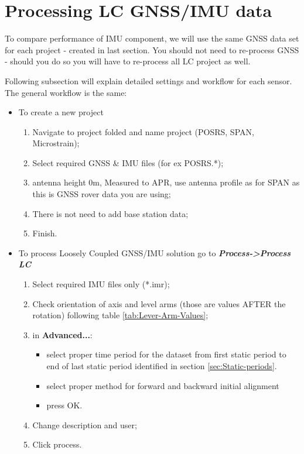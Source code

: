 \documentclass[british]{book}
\begin{document}
\chapter{Processing LC GNSS/IMU data\label{sec:Processing-Loosely-Coupled}}

To compare performance of IMU component, we will use the same GNSS data set for each project - created in last section. You should not need to re-process GNSS - should you do so you will have to re-process all LC project as well.  

Following subsection will explain detailed settings and workflow for each sensor. The general workflow is the same:

\begin{itemize}
	\item To create a new project 
	\begin{enumerate}
		\item Navigate to project folded and name project (POSRS, SPAN, Microstrain);
		\item Select required GNSS \& IMU files (for ex POSRS.{*});
		\item antenna height 0m, Measured to APR, use antenna profile as for SPAN as this is GNSS rover data you are using;
		\item There is not need to add base station data;
		\item Finish.
	\end{enumerate}
	\item To process Loosely Coupled GNSS/IMU solution go to \textbf{\emph{Process->Process LC}}
		\begin{enumerate}
			\item Select required IMU files only ({*}.imr);
			\item Check orientation of axis and level arms (those are values AFTER the rotation) following table \ref{tab:Lever-Arm-Values};
			\item in \textbf{Advanced...}:
			\begin{itemize}
			 	\item select proper time period for the dataset from first static period to end of last static period identified in section \ref{sec:Static-periods}.
			 	\item select proper method for forward and backward initial alignment
			 	\item press OK.
			 \end{itemize} 
			\item Change description and user;
			\item Click process.
		\end{enumerate}
\end{itemize}
\end{document}
